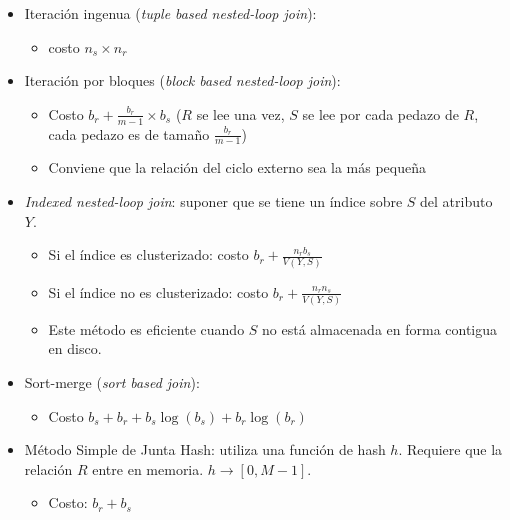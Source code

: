 \documentclass[a4paper, twoside]{article}
\newcommand{\codedir}{../resources/code} %
\begin{document}
\begin{itemize}
	\item Iteración ingenua (\emph{tuple based nested-loop join}): 
	\begin{itemize}
		\item costo $n_{s}\times n_{r}$
	\end{itemize}

	

	\item Iteración por bloques (\emph{block based nested-loop join}): 
	\begin{itemize}
		\item Costo $b_{r}+\frac{b_{r}}{m-1}\times b_{s}$ ($R$ se lee una vez, $S$ se lee por cada pedazo de $R$, cada pedazo es de tamaño $\frac{b_{r}}{m-1}$)
		\item Conviene que la relación del ciclo externo sea la más pequeña
	\end{itemize}

	

	\item \emph{Indexed nested-loop join}: suponer que se tiene un índice sobre $S$ del atributo $Y$.
	\begin{itemize}
		\item Si el índice es clusterizado: costo $b_{r}+\frac{n_{r}b_{s}}{V(Y,S)}$
		\item Si el índice no es clusterizado: costo $b_{r}+\frac{n_{r}n_{s}}{V(Y,S)}$
		\item Este método es eficiente cuando $S$ no está almacenada en forma contigua en disco.
	\end{itemize}

	

	\item Sort-merge (\emph{sort based join}): 
	\begin{itemize}
		\item Costo $b_{s}+b_{r}+b_{s}\log(b_{s})+b_{r}\log(b_{r})$
	\end{itemize}

	

	\item Método Simple de Junta Hash: utiliza una función de hash $h$. Requiere que la relación $R$ entre en memoria. $h\to[0,M-1]$.
	\begin{itemize}
		\item Costo: $b_{r}+b_{s}$
	\end{itemize}


\end{itemize}
\end{document}

